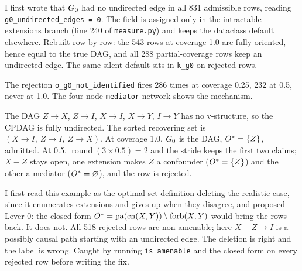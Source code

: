 \begin{armadilha}
I first wrote that $G_0$ had no undirected edge in all 831 admissible rows, reading \texttt{g0\_undirected\_edges = 0}. The
field is assigned only in the intractable-extensions branch (line 240 of \texttt{measure.py}) and keeps the dataclass default
elsewhere. Rebuilt row by row: the 543 rows at coverage 1.0 are fully oriented, hence equal to the true DAG, and all 288
partial-coverage rows keep an undirected edge. The same silent default sits in \texttt{k\_g0} on rejected rows.
\end{armadilha}

The rejection \texttt{o\_g0\_not\_identified} fires 286 times at coverage 0.25, 232 at 0.5, never at 1.0. The four-node
\texttt{mediator} network shows the mechanism.

\begin{exemplo}
The DAG $Z\to X$, $Z\to I$, $X\to I$, $X\to Y$, $I\to Y$ has no v-structure, so the CPDAG is fully undirected. The sorted
recovering set is $(X\to I,\ Z\to I,\ Z\to X)$. At coverage 1.0, $G_0$ is the DAG, $O^{*} = \{Z\}$, admitted. At 0.5,
$\operatorname{round}(3 \times 0.5) = 2$ and the stride keeps the first two claims; $X - Z$ stays open, one extension makes $Z$ a
confounder ($O^{*} = \{Z\}$) and the other a mediator ($O^{*} = \varnothing$), and the row is rejected.
\end{exemplo}

\begin{center}
\end{center}

\begin{armadilha}
I first read this example as the optimal-set definition deleting the realistic case, since it enumerates extensions and gives
up when they disagree, and proposed Lever 0: the closed form $O^{*} = \mathrm{pa}(\mathrm{cn}(X,Y)) \setminus
\mathrm{forb}(X,Y)$ would bring the rows back. It does not. All 518 rejected rows are non-amenable; here $X - Z \to I$ is a
possibly causal path starting with an undirected edge. The deletion is right and the label is wrong. Caught by running
\texttt{is\_amenable} and the closed form on every rejected row before writing the fix.
\end{armadilha}

